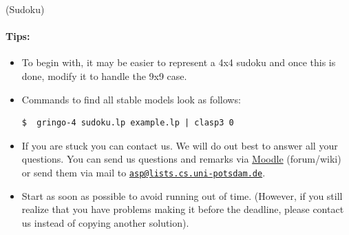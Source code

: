 \documentclass[a4paper,12pt]{article}
\begin{document}
\begin{PraktikumsAufgabe}{1}{(Sudoku)}
\paragraph{Tips:}
\begin{itemize}
\item To begin with, it may be easier to represent a 4x4 sudoku and once this is done, 
      modify it to handle the 9x9 case.
\item Commands to find all stable models look as follows:%
\vspace{-1.5mm}%
\begin{verbatim}
$  gringo-4 sudoku.lp example.lp | clasp3 0
\end{verbatim}
\vspace{-1mm}
%
\item If you are stuck you can contact us. We will do out best to answer all your questions.
      You can send us questions and remarks via 
      \href{http://moodle.cs.uni-potsdam.de/course/view.php?id=39}{Moodle} (forum/wiki)
      or send them via mail to 
      \href{mailto:asp@lists.cs.uni-potsdam.de}{\texttt{asp@lists.cs.uni-potsdam.de}}.
\item Start as soon as possible to avoid running out of time.
      (However, if you still realize that you have problems making it before the deadline,
       please contact us instead of copying another solution).
\end{itemize}

\end{PraktikumsAufgabe}
\end{document}
